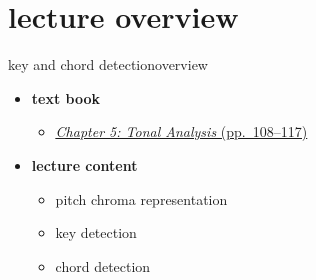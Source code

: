 

\subtitle{Part 6.6: Key and Chord Detection}


	

    \section[overview]{lecture overview}
        \begin{frame}{key and chord detection}{overview}
            \begin{itemize}
                \item   \textbf{text book}  
                    \begin{itemize}
                        \item   \href{http://ieeexplore.ieee.org/xpl/articleDetails.jsp?tp=&arnumber=6331122&}{\underline{\textit{Chapter 5: Tonal Analysis} (pp.~108--117)}}
                    \end{itemize}
                \bigskip
                \item<2->   \textbf{lecture content}
                    \begin{itemize}
                        \item<2->   pitch chroma representation
                        \item<3->   key detection
                        \item<4->   chord detection
                    \end{itemize}
            \end{itemize}
        \end{frame}

